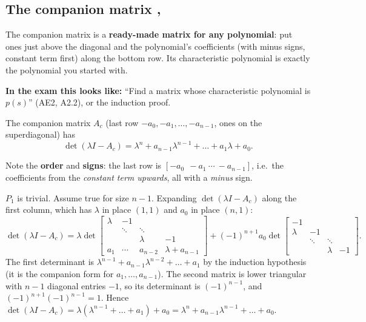 \subsection{The companion matrix \texorpdfstring{, }{}}\label{sec:companion}\label{ss:1-5}
\begin{plainbox}
The companion matrix is a \textbf{ready-made matrix for any polynomial}: put ones just above the diagonal and the
polynomial's coefficients (with minus signs, constant term first) along the bottom row. Its characteristic polynomial is exactly
the polynomial you started with.
\par\smallskip\textbf{In the exam this looks like:} ``Find a matrix whose characteristic polynomial is $p(s)$'' (AE2, A2.2), or the induction proof.
\end{plainbox}
\begin{thmbox}[title={Proposition 0.5: every monic polynomial is a characteristic polynomial}]
The companion matrix $A_c$ (last row $-a_0,-a_1,\dots,-a_{n-1}$, ones on the superdiagonal) has
\[ \det(\lambda I-A_c)=\lambda^n+a_{n-1}\lambda^{n-1}+\dots+a_1\lambda+a_0. \]
\end{thmbox}
\begin{warnbox}
Note the \textbf{order} and \textbf{signs}: the last row is $[-a_0\ \ -a_1\ \cdots\ -a_{n-1}]$, i.e.\ the coefficients from the
\emph{constant term upwards}, all with a \emph{minus} sign.
\end{warnbox}
\begin{proofbox}[title={Proof of Proposition 0.5 (induction on $n$; expand along the first column)}]
$P_1$ is trivial. Assume true for size $n-1$. Expanding $\det(\lambda I-A_c)$ along the first column, which has $\lambda$ in place $(1,1)$ and $a_0$ in place $(n,1)$:
\[ \det(\lambda I-A_c)=\lambda\det\begin{bmatrix}\lambda&-1&&\\&\ddots&\ddots&\\&&\lambda&-1\\a_1&\cdots&a_{n-2}&\lambda+a_{n-1}\end{bmatrix}+(-1)^{n+1}a_0\det\begin{bmatrix}-1&&&\\\lambda&-1&&\\&\ddots&\ddots&\\&&\lambda&-1\end{bmatrix}. \]
The first determinant is $\lambda^{n-1}+a_{n-1}\lambda^{n-2}+\dots+a_1$ by the induction hypothesis (it is the companion form for $a_1,\dots,a_{n-1}$).
The second matrix is lower triangular with $n-1$ diagonal entries $-1$, so its determinant is $(-1)^{n-1}$, and $(-1)^{n+1}(-1)^{n-1}=1$. Hence
$\det(\lambda I-A_c)=\lambda(\lambda^{n-1}+\dots+a_1)+a_0=\lambda^n+a_{n-1}\lambda^{n-1}+\dots+a_0$.
\end{proofbox}

